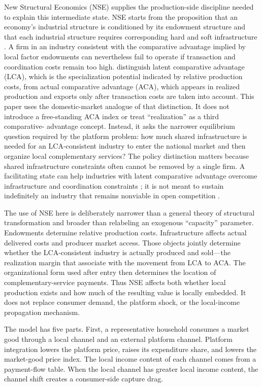 \documentclass[11pt]{article}
\theoremstyle{definition}
\theoremstyle{remark}
\begin{document}
New Structural Economics (NSE) supplies the production-side discipline needed
to explain this intermediate state.  NSE starts from the proposition that an
economy's industrial structure is conditioned by its endowment
structure and that each industrial structure requires corresponding hard and
soft infrastructure \citep{Lin2011,Lin2012}.  A firm in an industry consistent
with the comparative advantage implied by local factor endowments can
nevertheless fail to operate if transaction and coordination costs remain too
high.  \citet{LinWang2023} distinguish latent comparative advantage (LCA),
which is the specialization potential indicated by relative production costs,
from actual comparative advantage (ACA), which appears in realized production
and exports only after transaction costs are taken into account.  This paper
uses the domestic-market analogue of that distinction.  It does not introduce
a free-standing ACA index or treat ``realization'' as a third comparative-
advantage concept.  Instead, it asks the narrower equilibrium question required
by the platform problem: how much shared infrastructure is needed for an
LCA-consistent industry to enter the national market and then organize local
complementary services?  The policy distinction matters because shared
infrastructure constraints often cannot be removed by a single firm.  A
facilitating state can help industries with latent comparative advantage
overcome infrastructure and coordination constraints \citep{LinMonga2010}; it
is not meant to sustain indefinitely an industry that remains nonviable in open
competition \citep{Lin2003}.

The use of NSE here is deliberately narrower than a general theory of
structural transformation and broader than relabeling an exogenous
``capacity'' parameter.  Endowments determine relative production costs.
Infrastructure affects actual delivered costs and producer market access.
Those objects jointly determine whether the LCA-consistent industry is
actually produced and sold---the realization margin that
\citet{LinWang2023} associate with the movement from LCA to ACA.  The
organizational form used after entry then determines the location of
complementary-service payments.  Thus NSE affects both whether local
production exists and how much of the resulting value is locally embedded.
It does not replace consumer demand, the platform shock, or the local-income
propagation mechanism.

The model has five parts.  First, a representative household consumes a market
good through a local channel and an external platform channel.  Platform
integration lowers the platform price, raises its expenditure share, and
lowers the market-good price index.  The local income content of each channel
comes from a payment-flow table.  When the local channel has greater local
income content, the channel shift creates a consumer-side capture drag.
\end{document}

